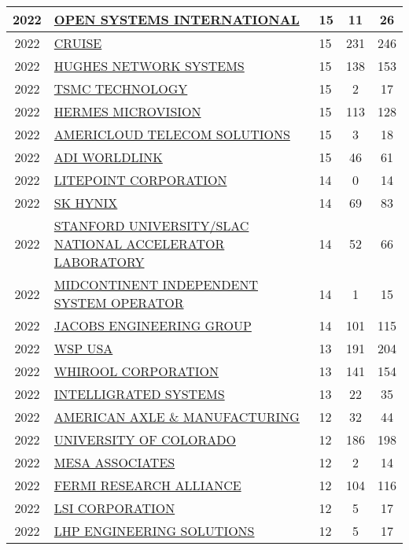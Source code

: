 \documentclass{article}%
\begin{document}
\begin{longtable}{c|p{20em}|p{5em}|c|c}
\hline%
2022&\hyperref[subsec:OPENSYSTEMSINTERNATIONAL]{OPEN SYSTEMS INTERNATIONAL}&15&11&26\\%
\hline%
2022&\hyperref[subsec:CRUISE]{CRUISE}&15&231&246\\%
\hline%
2022&\hyperref[subsec:HUGHESNETWORKSYSTEMS]{HUGHES NETWORK SYSTEMS}&15&138&153\\%
\hline%
2022&\hyperref[subsec:TSMCTECHNOLOGY]{TSMC TECHNOLOGY}&15&2&17\\%
\hline%
2022&\hyperref[subsec:HERMESMICROVISION]{HERMES MICROVISION}&15&113&128\\%
\hline%
2022&\hyperref[subsec:AMERICLOUDTELECOMSOLUTIONS]{AMERICLOUD TELECOM SOLUTIONS}&15&3&18\\%
\hline%
2022&\hyperref[subsec:ADIWORLDLINK]{ADI WORLDLINK}&15&46&61\\%
\hline%
2022&\hyperref[subsec:LITEPOINTCORPORATION]{LITEPOINT CORPORATION}&14&0&14\\%
\hline%
2022&\hyperref[subsec:SKHYNIX]{SK HYNIX}&14&69&83\\%
\hline%
2022&\hyperref[subsec:STANFORDUNIVERSITY/SLACNATIONALACCELERATORLABORATORY]{STANFORD UNIVERSITY/SLAC NATIONAL ACCELERATOR LABORATORY}&14&52&66\\%
\hline%
2022&\hyperref[subsec:MIDCONTINENTINDEPENDENTSYSTEMOPERATOR]{MIDCONTINENT INDEPENDENT SYSTEM OPERATOR}&14&1&15\\%
\hline%
2022&\hyperref[subsec:JACOBSENGINEERINGGROUP]{JACOBS ENGINEERING GROUP}&14&101&115\\%
\hline%
2022&\hyperref[subsec:WSPUSA]{WSP USA}&13&191&204\\%
\hline%
2022&\hyperref[subsec:WHIROOLCORPORATION]{WHIROOL CORPORATION}&13&141&154\\%
\hline%
2022&\hyperref[subsec:INTELLIGRATEDSYSTEMS]{INTELLIGRATED SYSTEMS}&13&22&35\\%
\hline%
2022&\hyperref[subsec:AMERICANAXLEMANUFACTURING]{AMERICAN AXLE \& MANUFACTURING}&12&32&44\\%
\hline%
2022&\hyperref[subsec:UNIVERSITYOFCOLORADO]{UNIVERSITY OF COLORADO}&12&186&198\\%
\hline%
2022&\hyperref[subsec:MESAASSOCIATES]{MESA ASSOCIATES}&12&2&14\\%
\hline%
2022&\hyperref[subsec:FERMIRESEARCHALLIANCE]{FERMI RESEARCH ALLIANCE}&12&104&116\\%
\hline%
2022&\hyperref[subsec:LSICORPORATION]{LSI CORPORATION}&12&5&17\\%
\hline%
2022&\hyperref[subsec:LHPENGINEERINGSOLUTIONS]{LHP ENGINEERING SOLUTIONS}&12&5&17\\%

\end{longtable}
\end{document}
